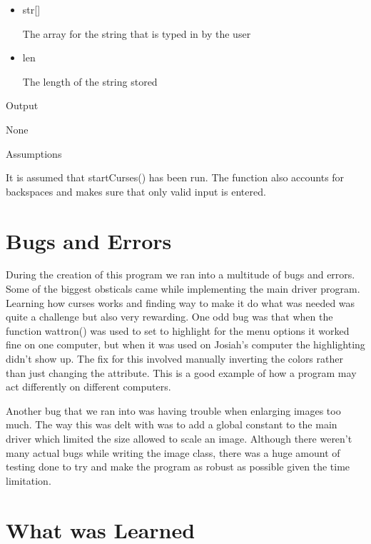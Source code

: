 \documentclass[pdftex, 11pt]{article}
\begin{document}
\begin{description}
\begin{description}
\begin{itemize}
					\item{str[]}

						The array for the string that is typed
						in by the user

					\item{len}

						The length of the string stored

				\end{itemize}

			\item{Output}

				None

			\item{Assumptions}

				It is assumed that startCurses() has been run.
				The function also accounts for backspaces and
				makes sure that only valid input is entered.

		\end{description}


\end{description}

\section{Bugs and Errors}

	During the creation of this program we ran into a multitude of bugs and errors.  Some of the biggest obsticals came
while implementing the main driver program.  Learning how curses works and finding way to make it do what was needed was
quite a challenge but also very rewarding.  One odd bug was that when the function wattron() was used to set to
highlight for the menu options it worked fine on one computer, but when it was used on Josiah's computer the
highlighting didn't show up.  The fix for this involved manually inverting the colors rather than just changing the
attribute.  This is a good example of how a program may act differently on different computers.

Another bug that we ran into was having trouble when enlarging images too much.  The way this was delt with was to add a
global constant to the main driver which limited the size allowed to scale an image.  Although there weren't many actual
bugs while writing the image class, there was a huge amount of testing done to try and make the program as robust as
possible given the time limitation.

\section{What was Learned}
\end{document}
